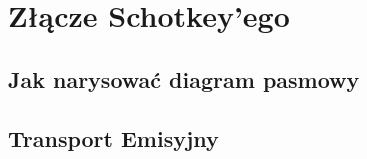 \chapter{Złącze Schotkey'ego}
    \section{Jak narysować diagram pasmowy}
    \section{Transport Emisyjny}